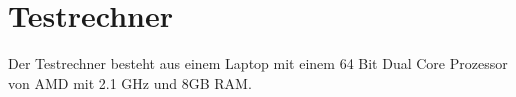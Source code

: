 \section{Testrechner}\label{Testrechner}
Der Testrechner besteht aus einem Laptop mit einem 64 Bit Dual Core Prozessor von AMD mit 2.1 GHz und 8GB RAM.